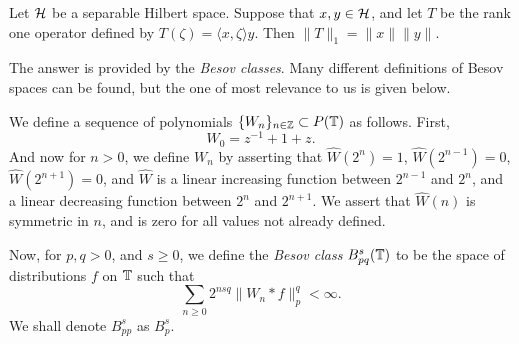 \begin{lemma}
    Let $\mathcal{H}$ be a separable Hilbert space. Suppose
    that $x,y \in \mathcal{H}$, and let $T$ be the rank one operator
    defined by $T(\zeta) = \langle x,\zeta\rangle y$. Then $\|T\|_1 = \|x\|\|y\|$.
\end{lemma}

The answer is provided by the \emph{Besov classes}. Many different definitions
of Besov spaces can be found, but the one of most relevance to us is given below.
\begin{definition}
    We define a sequence of polynomials $\{W_n\}_{n \in \mathbb{Z}} \subset P(\mathbb{T})$ as follows.
    First,
    \begin{equation*}
        W_0 = z^{-1}+1+z.
    \end{equation*}
    And now for $n > 0$, we define $W_n$ by asserting that $\widehat{W}(2^n) = 1$,
    $\widehat{W}(2^{n-1}) = 0$, $\widehat{W}(2^{n+1}) = 0$, and $\widehat{W}$
    is a linear increasing function between $2^{n-1}$ and $2^n$, and a
    linear decreasing function between $2^n$ and $2^{n+1}$. We
    assert that $\widehat{W}(n)$ is symmetric in $n$, and is zero for all
    values not already defined.
    
    Now, for $p,q > 0$, and $s \geq 0$, we define the \emph{Besov class}
    $B_{pq}^s(\mathbb{T})$ to be the space of distributions $f$ on $\mathbb{T}$ such that
    \begin{equation*}
        \sum_{n\geq 0} 2^{nsq} \|W_n*f\|_{p}^q < \infty.
    \end{equation*}  
    We shall denote $B_{pp}^s$ as $B_p^s$.
\end{definition}

